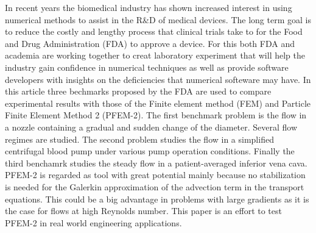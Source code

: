 In recent years the biomedical industry has shown increased interest in using numerical methods to assist in the R\&D of medical devices. The long term goal is to reduce the costly and lengthy process that clinical trials take to for the Food and Drug Administration (FDA) to approve a device. For this both FDA and academia are working together to creat laboratory experiment that will help the industry gain confidence in numerical techniques as well as provide software developers with insights on the deficiencies that numerical softeware may have. In this article three bechmarks proposed by the FDA are used to compare experimental results with those of the Finite element method (FEM) and Particle Finite Element Method 2 (PFEM-2). The first benchmark problem is the flow in a nozzle
containing a gradual and sudden change of the diameter. Several flow regimes are studied. The second problem studies the flow in a simplified centrifugal
blood pump under various pump operation conditions. Finally the third benchamrk studies the steady flow in a patient-averaged inferior vena cava. PFEM-2 is regarded as tool with great potential mainly because no stabilization is needed for the Galerkin approximation of the advection term in the transport equations. This could be a big advantage in problems with large gradients as it is the case for flows at high Reynolds number. This paper is an effort to test PFEM-2 in real world engineering applications.
